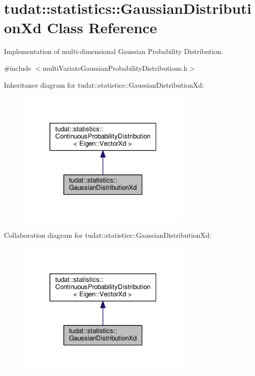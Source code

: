 \hypertarget{classtudat_1_1statistics_1_1GaussianDistributionXd}{}\section{tudat\+:\+:statistics\+:\+:Gaussian\+Distribution\+Xd Class Reference}
\label{classtudat_1_1statistics_1_1GaussianDistributionXd}


Implementation of multi-\/dimensional Gaussian Probability Distribution.  




{\ttfamily \#include $<$multi\+Variate\+Gaussian\+Probability\+Distributions.\+h$>$}



Inheritance diagram for tudat\+:\+:statistics\+:\+:Gaussian\+Distribution\+Xd\+:
\nopagebreak
\begin{figure}[H]
\begin{center}
\leavevmode
\includegraphics[width=241pt]{classtudat_1_1statistics_1_1GaussianDistributionXd__inherit__graph}
\end{center}
\end{figure}


Collaboration diagram for tudat\+:\+:statistics\+:\+:Gaussian\+Distribution\+Xd\+:
\nopagebreak
\begin{figure}[H]
\begin{center}
\leavevmode
\includegraphics[width=241pt]{classtudat_1_1statistics_1_1GaussianDistributionXd__coll__graph}
\end{center}
\end{figure}
